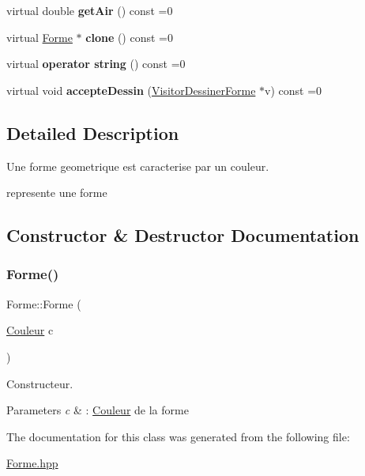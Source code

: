 \begin{DoxyCompactItemize}
\item 
\mbox{\label{class_forme_a8ec63ed6dead93c1c6c9239005895659}} 
virtual double {\bfseries get\+Air} () const =0
\item 
\mbox{\label{class_forme_a226750dc3f772514fe58e1dc16f3d0d5}} 
virtual \mbox{\hyperlink{class_forme}{Forme}} $\ast$ {\bfseries clone} () const =0
\item 
\mbox{\label{class_forme_a6ad05e3231b6753d2133ca5438e0feeb}} 
virtual {\bfseries operator string} () const =0
\item 
\mbox{\label{class_forme_aa687a4604068cf3181f8b8920ded5d61}} 
virtual void {\bfseries accepte\+Dessin} (\mbox{\hyperlink{class_visitor_dessiner_forme}{Visitor\+Dessiner\+Forme}} $\ast$v) const =0
\end{DoxyCompactItemize}


\subsection{Detailed Description}
Une forme geometrique est caracterise par un couleur. 

represente une forme 

\subsection{Constructor \& Destructor Documentation}
\mbox{\label{class_forme_a009ca469830cd3e0c622c2bd446d374b}} 
\subsubsection{\texorpdfstring{Forme()}{Forme()}}
{\footnotesize\ttfamily Forme\+::\+Forme (\begin{DoxyParamCaption}\item[{\mbox{\hyperlink{class_couleur}{Couleur}}}]{c }\end{DoxyParamCaption})\hspace{0.3cm}{\ttfamily [inline]}}



Constructeur. 


\begin{DoxyParams}{Parameters}
{\em c} & \+: \mbox{\hyperlink{class_couleur}{Couleur}} de la forme \\
\hline
\end{DoxyParams}


The documentation for this class was generated from the following file\+:\begin{DoxyCompactItemize}
\item 
\mbox{\hyperlink{_forme_8hpp}{Forme.\+hpp}}\end{DoxyCompactItemize}
